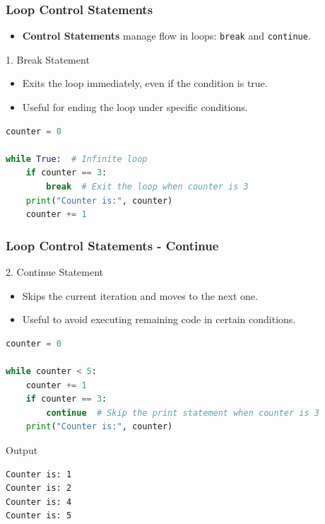 \documentclass{beamer}
\begin{document}
\begin{frame}[fragile]
    \frametitle{Loop Control Statements}
    \begin{itemize}
        \item \textbf{Control Statements} manage flow in loops: \texttt{break} and \texttt{continue}.
    \end{itemize}
    
    \begin{block}{1. Break Statement}
        \begin{itemize}
            \item Exits the loop immediately, even if the condition is true.
            \item Useful for ending the loop under specific conditions.
        \end{itemize}
        \begin{lstlisting}[language=Python]
counter = 0

while True:  # Infinite loop
    if counter == 3:
        break  # Exit the loop when counter is 3
    print("Counter is:", counter)
    counter += 1
        \end{lstlisting}
    \end{block}

\end{frame}

\begin{frame}[fragile]
    \frametitle{Loop Control Statements - Continue}
    \begin{block}{2. Continue Statement}
        \begin{itemize}
            \item Skips the current iteration and moves to the next one.
            \item Useful to avoid executing remaining code in certain conditions.
        \end{itemize}
        \begin{lstlisting}[language=Python]
counter = 0

while counter < 5:
    counter += 1
    if counter == 3:
        continue  # Skip the print statement when counter is 3
    print("Counter is:", counter)
        \end{lstlisting}
    \end{block}
    \begin{block}{Output}
        \begin{lstlisting}
Counter is: 1
Counter is: 2
Counter is: 4
Counter is: 5
        \end{lstlisting}
    \end{block}
\end{frame}
\end{document}
